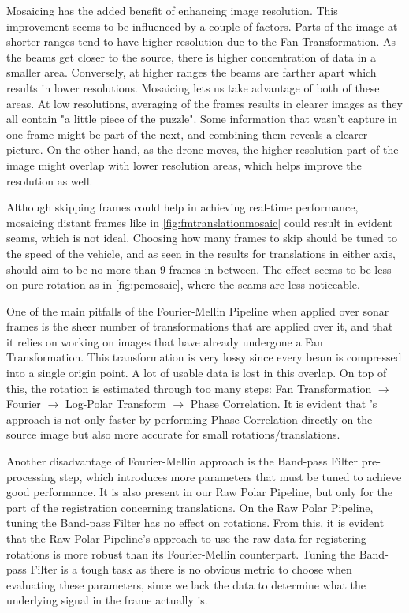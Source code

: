 Mosaicing has the added benefit of enhancing image resolution. This improvement seems to be influenced by a couple of factors. Parts of the image at shorter ranges tend to have higher resolution due to the Fan Transformation. As the beams get closer to the source, there is higher concentration of data in a smaller area. Conversely, at higher ranges the beams are farther apart which results in lower resolutions. Mosaicing lets us take advantage of both of these areas. At low resolutions, averaging of the frames results in clearer images as they all contain "a little piece of the puzzle". Some information that wasn't capture in one frame might be part of the next, and combining them reveals a clearer picture. On the other hand, as the drone moves, the higher-resolution part of the image might overlap with lower resolution areas, which helps improve the resolution as well. 

Although skipping frames could help in achieving real-time performance, mosaicing distant frames like in \autoref{fig:fmtranslationmosaic} could result in evident seams, which is not ideal. Choosing how many frames to skip should be tuned to the speed of the vehicle, and as seen in the results for translations in either axis, should aim to be no more than 9 frames in between. The effect seems to be less on pure rotation as in \autoref{fig:pcmosaic}, where the seams are less noticeable. 

One of the main pitfalls of the Fourier-Mellin Pipeline when applied over sonar frames is the sheer number of transformations that are applied over it, and that it relies on working on images that have already undergone a Fan Transformation. This transformation is very lossy since every beam is compressed into a single origin point. A lot of usable data is lost in this overlap. On top of this, the rotation is estimated through too many steps: Fan Transformation $\rightarrow$ Fourier $\rightarrow$ Log-Polar Transform $\rightarrow$ Phase Correlation. It is evident that \citeauthor{Hurtos2015}'s approach is not only faster by performing Phase Correlation directly on the source image but also more accurate for small rotations/translations. 

Another disadvantage of Fourier-Mellin approach is the Band-pass Filter pre-processing step, which introduces more parameters that must be tuned to achieve good performance. It is also present in our Raw Polar Pipeline, but only for the part of the registration concerning translations. On the Raw Polar Pipeline, tuning the Band-pass Filter has no effect on rotations. From this, it is evident that the Raw Polar Pipeline's approach to use the raw data for registering rotations is more robust than its Fourier-Mellin counterpart. Tuning the Band-pass Filter is a tough task as there is no obvious metric to choose when evaluating these parameters, since we lack the data to determine what the underlying signal in the frame actually is. 

